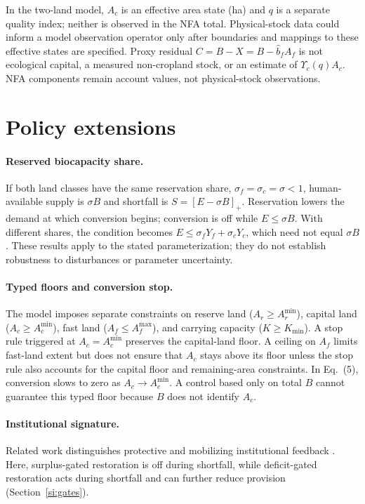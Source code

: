 \documentclass[11pt,a4paper]{article}
\newcommand{\Ups}{\Upsilon_c}
\newcommand{\Acmin}{A_c^{\min}}
\begin{document}
In the two-land model, $A_c$ is an effective area state (ha) and $q$ is a separate quality index; neither is observed in the NFA total. Physical-stock data could inform a model observation operator only after boundaries and mappings to these effective states are specified. Proxy residual $C=B-X=B-\hat b_fA_f$ is not ecological capital, a measured non-cropland stock, or an estimate of $\Ups(q)A_c$. NFA components remain account values, not physical-stock observations.
\section{Policy extensions}\label{si:policy}

\paragraph{Reserved biocapacity share.} If both land classes have the same reservation share, $\sigma_f=\sigma_c=\sigma<1$, human-available supply is $\sigma B$ and shortfall is $S=[E-\sigma B]_+$. Reservation lowers the demand at which conversion begins; conversion is off while $E\le\sigma B$. With different shares, the condition becomes $E\le\sigma_fY_f+\sigma_cY_c$, which need not equal $\sigma B$. These results apply to the stated parameterization; they do not establish robustness to disturbances or parameter uncertainty.

\paragraph{Typed floors and conversion stop.} The model imposes separate constraints on reserve land ($A_r\ge A_r^{\min}$), capital land ($A_c\ge\Acmin$), fast land ($A_f\le A_f^{\max}$), and carrying capacity ($K\ge K_{\min}$). A stop rule triggered at $A_c=\Acmin$ preserves the capital-land floor. A ceiling on $A_f$ limits fast-land extent but does not ensure that $A_c$ stays above its floor unless the stop rule also accounts for the capital floor and remaining-area constraints. In Eq.~(5), conversion slows to zero as $A_c\to\Acmin$. A control based only on total $B$ cannot guarantee this typed floor because $B$ does not identify $A_c$.

\paragraph{Institutional signature.} Related work distinguishes protective and mobilizing institutional feedback \citep{Abaee2026a}. Here, surplus-gated restoration is off during shortfall, while deficit-gated restoration acts during shortfall and can further reduce provision (Section~\ref{si:gates}).
\end{document}
